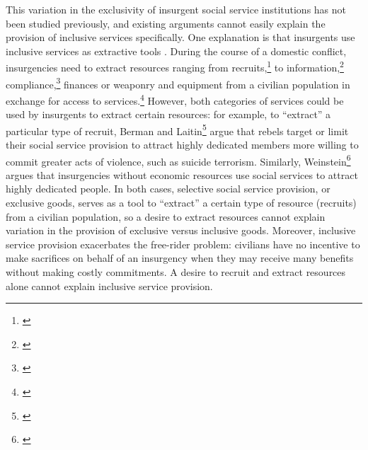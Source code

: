 \documentclass[12pt, letterpaper]{article}
\begin{document}
This variation in the exclusivity of insurgent social service institutions has not been studied previously, and existing arguments cannot easily explain the provision of inclusive services specifically. One explanation is that insurgents use inclusive services as extractive tools \citep{levi1989rule}. During the course of a domestic conflict, insurgencies need to extract resources ranging from recruits,\footnote{\citealt{berman2008religion, weinstein2006inside}} to information,\footnote{\citealt{berman2011can}} compliance,\footnote{\citealt{kalyvas2006logic}} finances or weaponry and equipment from a civilian population in exchange for access to services.\footnote{\citealt{levi1989rule, salehyan2014external}} However, both categories of services could be used by insurgents to extract certain resources: for example, to ``extract'' a particular type of recruit, Berman and Laitin\footnote{\citealt{berman2008religion}} argue that rebels target or limit their social service provision to attract highly dedicated members more willing to commit greater acts of violence, such as suicide terrorism. Similarly, Weinstein\footnote{\citealt{weinstein2006inside}} argues that insurgencies without economic resources use social services to attract highly dedicated people. In both cases, selective social service provision, or exclusive goods, serves as a tool to ``extract'' a certain type of resource (recruits) from a civilian population, so a desire to extract resources cannot explain variation in the provision of exclusive versus inclusive goods. Moreover, inclusive service provision exacerbates the free-rider problem: civilians have no incentive to make sacrifices on behalf of an insurgency when they may receive many benefits without making costly commitments. A desire to recruit and extract resources alone cannot explain inclusive service provision.

\end{document}
